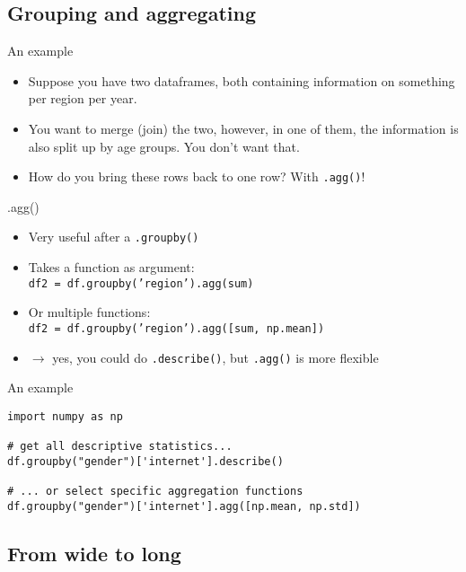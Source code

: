 \subsection{Grouping and aggregating}


\begin{frame}{An example}
\begin{itemize}
	\item Suppose you have two dataframes, both containing information on something  per region per year.
	\item You want to merge (join) the two, however, in one of them, the information is also split up by age groups. You don't want that.
	\item How do you bring these rows back to one row? With \texttt{.agg()}!
\end{itemize}

\end{frame}


\begin{frame}{.agg()}
\begin{itemize}[<+->]
	\item Very useful after a \texttt{.groupby()}
	\item Takes a function as argument: \\	\texttt{df2 = df.groupby('region').agg(sum)}
	\item Or multiple functions: \\ \texttt{df2 = df.groupby('region').agg([sum, np.mean])}
	\item $\rightarrow$ yes, you could do \texttt{.describe()}, but \texttt{.agg()} is more flexible	
\end{itemize}
\end{frame}


\begin{frame}[fragile]{An example}
\begin{verbatim}
import numpy as np

# get all descriptive statistics...
df.groupby("gender")['internet'].describe()

# ... or select specific aggregation functions
df.groupby("gender")['internet'].agg([np.mean, np.std])
\end{verbatim}
\end{frame}


\subsection{From wide to long}

